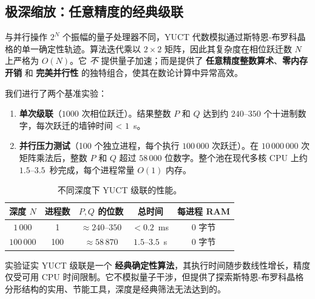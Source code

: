 \documentclass[11pt,a4paper]{article}
\begin{document}
	\subsection{极深缩放：任意精度的经典级联}
	
	与并行操作 \(2^N\) 个振幅的量子处理器不同，YUCT 代数模拟通过斯特恩-布罗科晶格的单一确定性轨迹。算法迭代乘以 \(2\times2\) 矩阵，因此其复杂度在相位跃迁数 \(N\) 上严格为 \(O(N)\)。它 \emph{不} 提供量子加速；而是提供了 \textbf{任意精度整数算术}、\textbf{零内存开销} 和 \textbf{完美并行性} 的独特组合，使其在数论计算中异常高效。
	
	我们进行了两个基准实验：
	
	\begin{enumerate}[leftmargin=*]
		\item \textbf{单次级联}（\(1000\) 次相位跃迁）。结果整数 \(P\) 和 \(Q\) 达到约 \(240\)--\(350\) 个十进制数字，每次跃迁的墙钟时间 < \(1\)~\textmu s。
		\item \textbf{并行压力测试}（100 个独立进程，每个执行 \(100\,000\) 次跃迁）。在 \(10\,000\,000\) 次矩阵乘法后，整数 \(P\) 和 \(Q\) 超过 \(58\,000\) 位数字。整个池在现代多核 CPU 上约 \(1.5\)--\(3.5\)~秒完成，每个进程常量 \(O(1)\) 内存。
	\end{enumerate}
	
	\begin{table}[htbp]
		\centering
		\caption{不同深度下 YUCT 级联的性能。}
		\label{tab:cascade-bench}
		\begin{tabular}{c c c c c}
			\toprule
			深度 \(N\) & 进程数 & \(P,Q\) 的位数 & 总时间 & 每进程 RAM \\
			\midrule
			\(1\,000\)   & 1   & \(\approx 240\)--\(350\) & \(< 0.2\)\ ms & 0 字节 \\
			\(100\,000\) & 100 & \(\approx 58\,870\)     & \(1.5\)--\(3.5\)\ s & 0 字节 \\
			\bottomrule
		\end{tabular}
	\end{table}
	
	实验证实 YUCT 级联是一个 \textbf{经典确定性算法}，其执行时间随步数线性增长，精度仅受可用 CPU 时间限制。它不模拟量子干涉，但提供了探索斯特恩-布罗科晶格分形结构的实用、节能工具，深度是经典筛法无法达到的。
	
\end{document}
